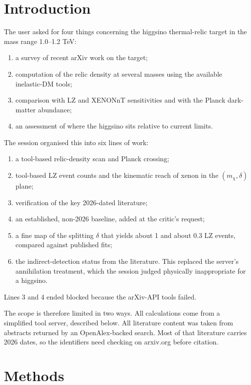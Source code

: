 \documentclass[11pt,a4paper]{article}
\begin{document}
\section{Introduction}
The user asked for four things concerning the higgsino thermal-relic target in the mass range 1.0--1.2 TeV:
\begin{enumerate}
\item a survey of recent arXiv work on the target;
\item computation of the relic density at several masses using the available inelastic-DM tools;
\item comparison with LZ and XENONnT sensitivities and with the Planck dark-matter abundance;
\item an assessment of where the higgsino sits relative to current limits.
\end{enumerate}

The session organised this into six lines of work:
\begin{enumerate}
\item a tool-based relic-density scan and Planck crossing;
\item tool-based LZ event counts and the kinematic reach of xenon in the $(m_\chi,\delta)$ plane;
\item verification of the key 2026-dated literature;
\item an established, non-2026 baseline, added at the critic's request;
\item a fine map of the splitting $\delta$ that yields about 1 and about 0.3 LZ events, compared against published fits;
\item the indirect-detection status from the literature. This replaced the server's annihilation treatment, which the session judged physically inappropriate for a higgsino.
\end{enumerate}
Lines 3 and 4 ended blocked because the arXiv-API tools failed.

The scope is therefore limited in two ways. All calculations come from a simplified tool server, described below. All literature content was taken from abstracts returned by an OpenAlex-backed search. Most of that literature carries 2026 dates, so the identifiers need checking on arxiv.org before citation.

\section{Methods}
\end{document}
